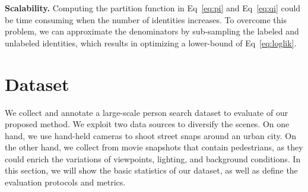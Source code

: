 \documentclass[10pt,twocolumn,letterpaper]{article}
\begin{document}
\textbf{Scalability.} Computing the partition function in Eq~\eqref{eq:pi} and Eq~\eqref{eq:qi} could be time consuming when the number of identities increases. To overcome this problem, we can approximate the denominators by sub-sampling the labeled and unlabeled identities, which results in optimizing a lower-bound of Eq~\eqref{eq:loglik}.


\section{Dataset} %
\label{sec:dataset}
We collect and annotate a large-scale person search dataset to evaluate of our proposed method. We exploit two data sources to diversify the scenes. On one hand, we use hand-held cameras to shoot street snaps around an urban city. On the other hand, we collect from movie snapshots that contain pedestrians, as they could enrich the variations of viewpoints, lighting, and background conditions. In this section, we will show the basic statistics of our dataset, as well as define the evaluation protocols and metrics.
\end{document}
